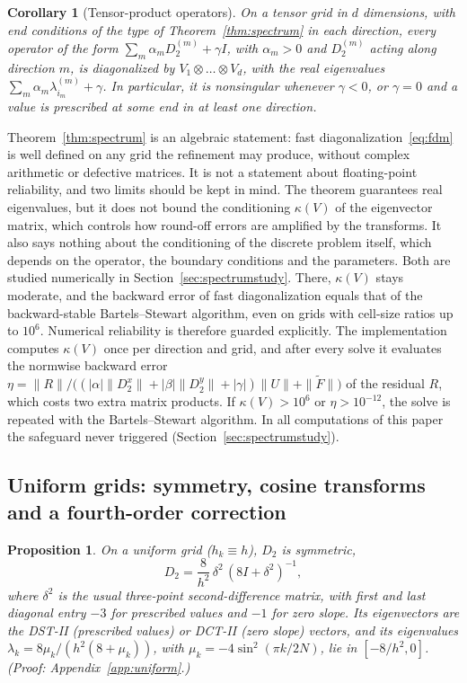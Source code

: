 \documentclass[preprint,12pt]{elsarticle}
\newtheorem{proposition}[theorem]{Proposition}
\newtheorem{corollary}[theorem]{Corollary}
\theoremstyle{remark}
\newcommand{\proofin}[1]{\hfill{\small\emph{(Proof: Appendix~\ref{#1}.)}}}
\begin{document}
\begin{corollary}[Tensor-product operators]\label{cor:tensor}
On a tensor grid in $d$ dimensions, with end conditions of the type of Theorem~\ref{thm:spectrum} in
each direction, every operator of the form $\sum_m\alpha_mD_2^{(m)}+\gamma I$, with $\alpha_m>0$ and
$D_2^{(m)}$ acting along direction $m$, is diagonalized by $V_1\otimes\dots\otimes V_d$, with the real
eigenvalues $\sum_m\alpha_m\lambda^{(m)}_{i_m}+\gamma$. In particular, it is nonsingular whenever
$\gamma<0$, or $\gamma=0$ and a value is prescribed at some end in at least one direction.
\end{corollary}

Theorem~\ref{thm:spectrum} is an algebraic statement: fast diagonalization~\eqref{eq:fdm} is well
defined on any grid the refinement may produce, without complex arithmetic or defective matrices. It is
not a statement about floating-point reliability, and two limits should be kept in mind. The theorem guarantees real eigenvalues, but it does not bound the
conditioning $\kappa(V)$ of the eigenvector matrix, which controls how round-off errors are amplified by
the transforms. It also says nothing about the conditioning of the discrete problem itself, which
depends on the operator, the boundary conditions and the parameters. Both are studied numerically in
Section~\ref{sec:spectrumstudy}. There, $\kappa(V)$ stays moderate, and the backward error of fast
diagonalization equals that of the backward-stable Bartels--Stewart algorithm, even on grids with
cell-size ratios up to $10^6$. Numerical reliability is therefore guarded explicitly. The implementation computes $\kappa(V)$ once per
direction and grid, and after every solve it evaluates the normwise backward error
$\eta=\|R\|/\big((|\alpha|\|D_2^x\|+|\beta|\|D_2^y\|+|\gamma|)\|U\|+\|\tilde F\|\big)$ of the residual $R$,
which costs two extra matrix products. If $\kappa(V)>10^6$ or $\eta>10^{-12}$, the solve is repeated with the
Bartels--Stewart algorithm. In all computations of this paper the safeguard never triggered
(Section~\ref{sec:spectrumstudy}).

\subsection{Uniform grids: symmetry, cosine transforms and a fourth-order correction}
\begin{proposition}\label{prop:uniform}
On a uniform grid ($h_k\equiv h$), $D_2$ is symmetric,
\begin{equation}\label{eq:D2}
D_2=\frac{8}{h^2}\,\delta^2\,(8I+\delta^2)^{-1},
\end{equation}
where $\delta^2$ is the usual three-point second-difference matrix, with first and last diagonal entry
$-3$ for prescribed values and $-1$ for zero slope. Its eigenvectors are the DST-II (prescribed values)
or DCT-II (zero slope) vectors, and its eigenvalues $\lambda_k=8\mu_k/(h^2(8+\mu_k))$, with
$\mu_k=-4\sin^2(\pi k/2N)$, lie in $[-8/h^2,0]$.
\proofin{app:uniform}
\end{proposition}
\end{document}

